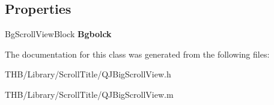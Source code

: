 \subsection*{Properties}
\begin{DoxyCompactItemize}
\item 
\mbox{\label{interface_q_j_big_scroll_view_a433e66d395b35428384a107edb4a8093}} 
Bg\+Scroll\+View\+Block {\bfseries Bgbolck}
\end{DoxyCompactItemize}


The documentation for this class was generated from the following files\+:\begin{DoxyCompactItemize}
\item 
T\+H\+B/\+Library/\+Scroll\+Title/Q\+J\+Big\+Scroll\+View.\+h\item 
T\+H\+B/\+Library/\+Scroll\+Title/Q\+J\+Big\+Scroll\+View.\+m\end{DoxyCompactItemize}
